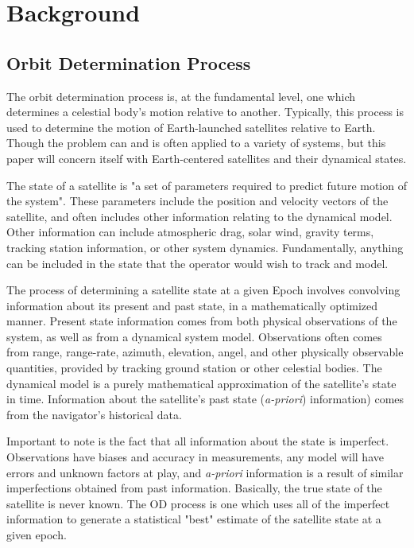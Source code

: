 \documentclass[12pt,a4paper,oneside]{article}
\begin{document}
\newpage
\section{Background}

\subsection{Orbit Determination Process}
The orbit determination process is, at the fundamental level, one which determines a celestial body's motion relative to another. Typically, this process is used to determine the motion of Earth-launched satellites relative to Earth. Though the problem can and is often applied to a variety of systems, but this paper will concern itself with Earth-centered satellites and their dynamical states. 

The state of a satellite is "a set of parameters required to predict future motion of the system"\cite{tapley2004statistical}. These parameters include the position and velocity vectors of the satellite, and often includes other information relating to the dynamical model. Other information can include atmospheric drag, solar wind, gravity terms, tracking station information, or other system dynamics. Fundamentally, anything can be included in the state that the operator would wish to track and model. 

The process of determining a satellite state at a given Epoch involves convolving information about its present and past state, in a mathematically optimized manner. Present state information comes from both physical observations of the system, as well as from a dynamical system model. Observations often comes from range, range-rate, azimuth, elevation, angel, and other physically observable quantities, provided by tracking ground station or other celestial bodies. The dynamical model is a purely mathematical approximation of the satellite's state in time. Information about the satellite's past state (\emph{a-priori}) information) comes from the navigator's historical data. 

Important to note is the fact that all information about the state is imperfect. Observations have biases and accuracy in measurements, any model will have errors and unknown factors at play, and \emph{a-priori} information is a result of similar imperfections obtained from past information. Basically, the true state of the satellite is never known. The OD process is one which uses all of the imperfect information to generate a statistical "best" estimate of the satellite state at a given epoch. 
\end{document}
